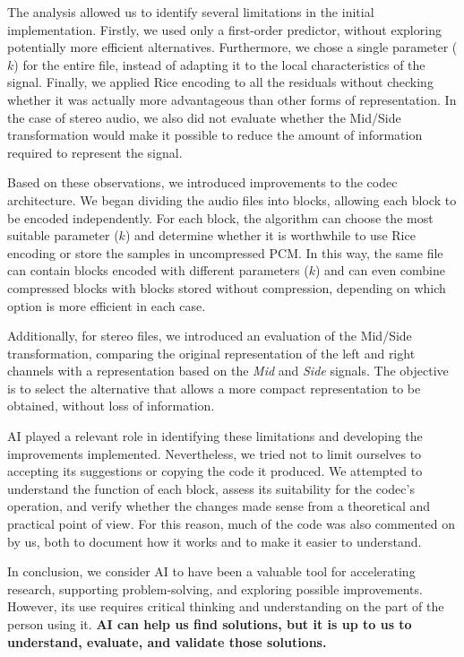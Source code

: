 The analysis allowed us to identify several limitations in the initial implementation. Firstly, we used only a first-order predictor, without exploring potentially more efficient alternatives. Furthermore, we chose a single parameter ($k$) for the entire file, instead of adapting it to the local characteristics of the signal. Finally, we applied Rice encoding to all the residuals without checking whether it was actually more advantageous than other forms of representation. In the case of stereo audio, we also did not evaluate whether the Mid/Side transformation would make it possible to reduce the amount of information required to represent the signal.

Based on these observations, we introduced improvements to the codec architecture. We began dividing the audio files into blocks, allowing each block to be encoded independently. For each block, the algorithm can choose the most suitable parameter ($k$) and determine whether it is worthwhile to use Rice encoding or store the samples in uncompressed PCM. In this way, the same file can contain blocks encoded with different parameters ($k$) and can even combine compressed blocks with blocks stored without compression, depending on which option is more efficient in each case.

Additionally, for stereo files, we introduced an evaluation of the Mid/Side transformation, comparing the original representation of the left and right channels with a representation based on the \textit{Mid} and \textit{Side} signals. The objective is to select the alternative that allows a more compact representation to be obtained, without loss of information.

AI played a relevant role in identifying these limitations and developing the improvements implemented. Nevertheless, we tried not to limit ourselves to accepting its suggestions or copying the code it produced. We attempted to understand the function of each block, assess its suitability for the codec's operation, and verify whether the changes made sense from a theoretical and practical point of view. For this reason, much of the code was also commented on by us, both to document how it works and to make it easier to understand.

In conclusion, we consider AI to have been a valuable tool for accelerating research, supporting problem-solving, and exploring possible improvements. However, its use requires critical thinking and understanding on the part of the person using it. \textbf{AI can help us find solutions, but it is up to us to understand, evaluate, and validate those solutions.}